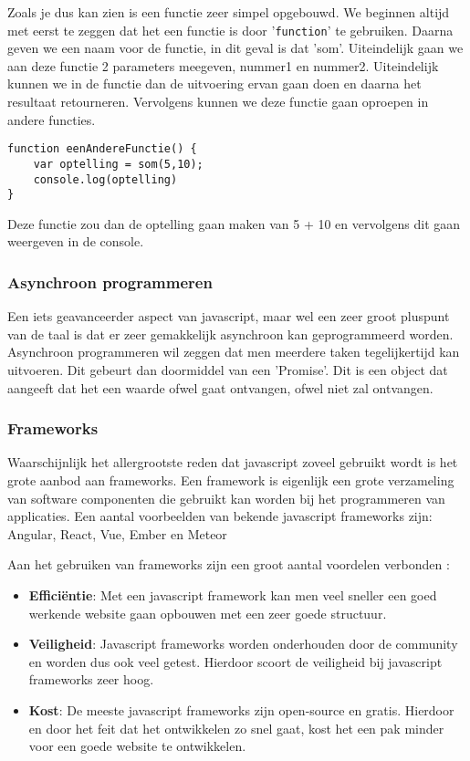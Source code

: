 Zoals je dus kan zien is een functie zeer simpel opgebouwd. We beginnen altijd met eerst te zeggen dat het een functie is door '\lstinline[basicstyle=\ttfamily\color{red}]|function|' te gebruiken. Daarna geven we een naam voor de functie, in dit geval is dat 'som'. Uiteindelijk gaan we aan deze functie 2 parameters meegeven, nummer1 en nummer2. Uiteindelijk kunnen we in de functie dan de uitvoering ervan gaan doen en daarna het resultaat retourneren. Vervolgens kunnen we deze functie gaan oproepen in andere functies.

\begin{lstlisting}[frame=single, caption=Een functie de som functie oproept]
function eenAndereFunctie() {
	var optelling = som(5,10);
	console.log(optelling)
}
\end{lstlisting}

Deze functie zou dan de optelling gaan maken van 5 + 10 en vervolgens dit gaan weergeven in de console.

\subsubsection{Asynchroon programmeren}
\label{sssec:asynchroon-programmeren}
Een iets geavanceerder aspect van javascript, maar wel een zeer groot pluspunt van de taal is dat er zeer gemakkelijk asynchroon kan geprogrammeerd worden. Asynchroon programmeren wil zeggen dat men meerdere taken tegelijkertijd kan uitvoeren. Dit gebeurt dan doormiddel van een 'Promise'. Dit is een object dat aangeeft dat het een waarde ofwel gaat ontvangen, ofwel niet zal ontvangen.

\subsubsection{Frameworks}
\label{sssec:frameworks}
Waarschijnlijk het allergrootste reden dat javascript zoveel gebruikt wordt is het grote aanbod aan frameworks. Een framework is eigenlijk een grote verzameling van software componenten die gebruikt kan worden bij het programmeren van applicaties. Een aantal voorbeelden van bekende javascript frameworks zijn: Angular, React, Vue, Ember en Meteor

Aan het gebruiken van frameworks zijn een groot aantal voordelen verbonden \autocite{Korotya2018}:

\begin{itemize}
	\item \textbf{Efficiëntie}: Met een javascript framework kan men veel sneller een goed werkende website gaan opbouwen met een zeer goede structuur.
	\item \textbf{Veiligheid}: Javascript frameworks worden onderhouden door de community en worden dus ook veel getest. Hierdoor scoort de veiligheid bij javascript frameworks zeer hoog.
	\item \textbf{Kost}: De meeste javascript frameworks zijn open-source en gratis. Hierdoor en door het feit dat het ontwikkelen zo snel gaat, kost het een pak minder voor een goede website te ontwikkelen.
\end{itemize}


